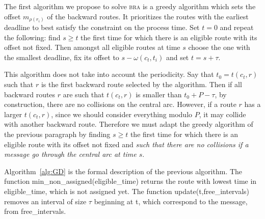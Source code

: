 \documentclass[10pt, conference, letterpaper]{IEEEtran}
\newcommand\bra{\textsc{bra}\xspace}
\begin{document}
    The first algorithm we propose to solve \bra is a greedy algorithm which sets the offset $m_{\rho(r_i)}$ of the 
    backward routes. It prioritizes the routes with the earliest deadline to best satisfy the
    constraint on the process time. Set $t=0$ and repeat the following: find $s \geq t$ the first time for which there is an eligible route with its offset not fixed. Then amongst all eligible routes at time $s$ choose the one with the smallest deadline, fix its offset to $s - \omega(c_t,t_i) $ and set $t = s + \tau$.
    
    This algorithm does not take into account the periodicity. Say that $t_0 = t(c_t,r)$ such that $r$ is the first backward route selected by the algorithm. Then if all backward routes $r$ are such that $t(c_t,r)$ is smaller than $t_0 + P - \tau$,
    by construction, there are no collisions on the central arc.
    However, if a route $r$ has a larger $t(c_t,r)$, since we should consider everything modulo $P$, 
    it may collide with another backward route. Therefore we must adapt the greedy algorithm of the previous paragraph by finding $s \geq t$ the first time for which there is an eligible route with its offset not fixed and \emph{such that there are no collisions if a message go through the central arc at time $s$}. 
    
    Algorithm~\ref{alg:GD} is the formal description of the previous algorithm. 
     The function  min\_non\_assigned(eligible\_time) returns the route with lowest time in eligible\_time, which is not assigned yet. The function update(t,free\_intervals) removes an interval of size $\tau$ beginning at t, which correspond to the message,  from free\_intervals.
     
\end{document}
